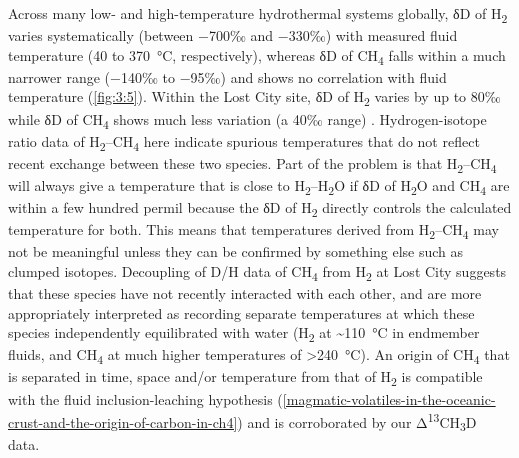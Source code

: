 Across many low- and high-temperature hydrothermal systems globally, δD
of H\textsubscript{2} varies systematically (between $-$700‰ and $-$330‰)
with measured fluid temperature (40 to 370~°C, respectively), whereas δD
of CH\textsubscript{4} falls within a much narrower range ($-$140‰ to
$-$95‰) and shows no correlation with fluid temperature (\autoref{fig:3:5}). Within
the Lost City site, δD of H\textsubscript{2} varies by up to 80‰ while
δD of CH\textsubscript{4} shows much less variation (a 40‰ range)
\parencite{Proskurowski++_2006_CG}.\footnotemark{} 
Hydrogen-isotope ratio data of H\textsubscript{2}--CH\textsubscript{4} here 
indicate spurious temperatures that do not reflect recent exchange 
between these two species.\footnotemark{} 
Part of the problem is that H\textsubscript{2}--CH\textsubscript{4} will always give a temperature
that is close to H\textsubscript{2}--H\textsubscript{2}O if δD of
H\textsubscript{2}O and CH\textsubscript{4} are within a few hundred
permil because the δD of H\textsubscript{2} directly controls the
calculated temperature for both. This means that temperatures derived
from H\textsubscript{2}--CH\textsubscript{4} may not be meaningful
unless they can be confirmed by something else such as clumped isotopes.
Decoupling of D/H data of CH\textsubscript{4} from H\textsubscript{2} at
Lost City suggests that these species have not recently interacted with
each other, and are more appropriately interpreted as recording separate
temperatures at which these species independently equilibrated with
water (H\textsubscript{2} at \textasciitilde{}110~°C in endmember
fluids, and CH\textsubscript{4} at much higher temperatures of
\textgreater{}240~°C). An origin of CH\textsubscript{4} that is
separated in time, space and/or temperature from that of
H\textsubscript{2} is compatible with the fluid inclusion-leaching
hypothesis (\autoref{magmatic-volatiles-in-the-oceanic-crust-and-the-origin-of-carbon-in-ch4}) and is corroborated by our
Δ\textsuperscript{13}CH\textsubscript{3}D data.

